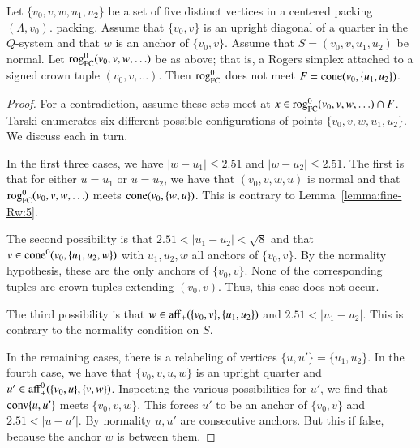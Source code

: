 \begin{lemma}
Let $\{v_0,v,w,u_1,u_2\}$ be a set of five distinct vertices in a
centered packing $(\Lambda,v_0)$.
packing.  Assume that $\{v_0,v\}$ is an upright diagonal of a quarter
in the $Q$-system and that $w$ is an anchor of $\{v_0,v\}$.
Assume that $S=(v_0,v,u_1,u_2)$ be normal.
Let ${\operatorname{rog}}^0_{\text{FC}}(v_0,v,w,\ldots)$ be as above; that is, a Rogers simplex attached to a signed crown tuple $(v_0,v,\ldots)$.
Then ${\operatorname{rog}}^0_{\text{FC}}$ does not meet $F={\operatorname{cone}}(v_0,\{u_1,u_2\})$.
\end{lemma}



\begin{proof}
For a contradiction, assume these sets meet at $x\in {\operatorname{rog}}^0_{\text{FC}}(v_0,v,w,\ldots)\cap F$.
Tarski enumerates six different possible
configurations of points $\{v_0,v,w,u_1,u_2\}$.  We discuss each
in turn.

In the first three cases, 
%
we have $|w-u_1|\le 2.51$ and $|w-u_2|\le 2.51$.  The first is that
for either $u=u_1$ or $u=u_2$, we have that $(v_0,v,w,u)$ is normal
and that ${\operatorname{rog}}^0_{\text{FC}}(v_0,v,w,\ldots)$ meets ${\operatorname{cone}}(v_0,\{w,u\})$.  This is contrary to
Lemma~\ref{lemma:fine-Rw:5}.

The second possibility is that
$2.51<|u_1-u_2|<\sqrt8$ and that $v\in{\operatorname{cone}}^0(v_0,\{u_1,u_2,w\})$
with $u_1,u_2,w$ all anchors of $\{v_0,v\}$.  By the normality
hypothesis, these are the only anchors of $\{v_0,v\}$.  None of the
corresponding tuples are crown tuples extending
$(v_0,v)$.  Thus, this case does not
occur. 

The third possibility is that $w\in {\operatorname{aff}}_+(\{v_0,v\},\{u_1,u_2\})$
and $2.51<|u_1-u_2|$.  This is contrary to the normality
condition on $S$.

In the remaining cases, there is a 
relabeling of vertices $\{u,u'\}=\{u_1,u_2\}$.
In the fourth case, we have that $\{v_0,v,u,w\}$ is an upright
quarter and $u'\in {\operatorname{aff}}_+^0(\{v_0,u\},\{v,w\})$.  Inspecting
the various possibilities for $u'$, we find that
${\operatorname{conv}}\{u,u'\}$ meets $\{v_0,v,w\}$.  This forces $u'$ to be
an anchor of $\{v_0,v\}$ and $2.51 < |u-u'|$.  By normality
$u,u'$ are consecutive anchors.  But this if false, because the
anchor  $w$ is between them.


\end{proof}
